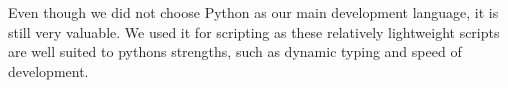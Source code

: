 Even though we did not choose Python as our main development language, it is still very valuable. We used it for scripting as these relatively lightweight scripts are well suited to pythons strengths, such as dynamic typing and speed of development. 